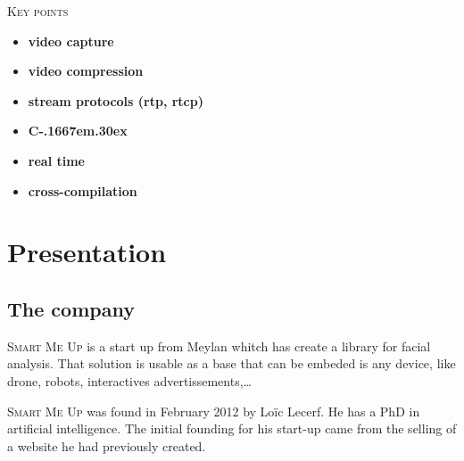 \documentclass[a4paper,11pt]{custom}
\newcommand{\smu}{\textsc{Smart Me Up}}
\newcommand{\cpp}{%
  C\kern-.1667em\raise.30ex\hbox{\smaller{++}}%
  \spacefactor1000%
}
\begin{document}
\begin{center}
\textsc{\textsc{Key points}}
\end{center}

\begin{multicols}{2}
\begin{itemize}
\item \textbf{video capture}
\item \textbf{video compression}
\item \textbf{stream protocols (rtp, rtcp)}
\item \textbf{\cpp}
\item \textbf{real time}
\item \textbf{cross-compilation}
\end{itemize}
\end{multicols}

\newpage

%
\headerleftcontent{\headerlefttext}%
\headerrightcontent{\headerrighttext}%

\tableofcontents

\clearpage

\chapter{Presentation}


\section{The company}

\smu{} is a start up from Meylan whitch has create a library for facial
analysis. That solution is usable as a base that can be embeded is any device,
like drone, robots, interactives advertissements,…

\smu{} was found in February 2012 by Loïc Lecerf. He has a PhD in artificial
intelligence. The initial founding for his start-up came from the selling of
a website he had previously created.
\end{document}
